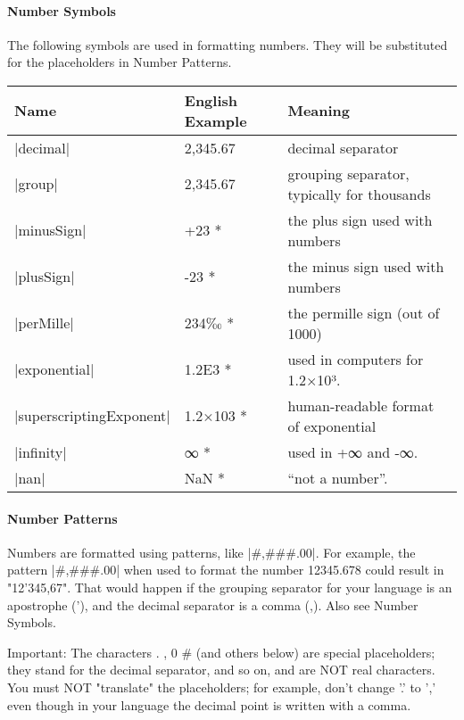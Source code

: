 \paragraph{Number Symbols} The following symbols are used in formatting numbers. They will be substituted for the placeholders in Number Patterns. 

\begin{longtable}{llp{5cm}}
\toprule
Name	&English Example	&Meaning\\
\midrule
|decimal|	  &2,345.67	 &decimal separator\\
|group|	     &2,345.67	 &grouping separator, typically for thousands\\
|minusSign|  &	+23	*	 &the plus sign used with numbers\\
|plusSign|	  &-23	*	    &the minus sign used with numbers\\ 
|perMille|	  &234‰	*	&the permille sign (out of 1000)\\
|exponential|	      &1.2E3	*	&used in computers for 1.2×10³.\\
|superscriptingExponent|	&1.2×103	* &human-readable format of exponential \\
|infinity|	  &∞	*	&used in +∞ and -∞.\\ 
|nan|	     &NaN	*	&\enquote{not a number}. \\
\bottomrule
\end{longtable}



\paragraph{Number Patterns}

Numbers are formatted using patterns, like |#,###.00|. For example, the pattern |#,###.00| when used to format the number 12345.678 could result in "12'345,67". That would happen if the grouping separator for your language is an apostrophe ('), and the decimal separator is a comma (,).  Also see Number Symbols.

Important: The characters . , 0 \# (and others below) are special placeholders; they stand for the decimal separator, and so on, and are NOT real characters. You must NOT "translate" the placeholders; for example, don't change '.' to ',' even though in your language the decimal point is written with a comma.

